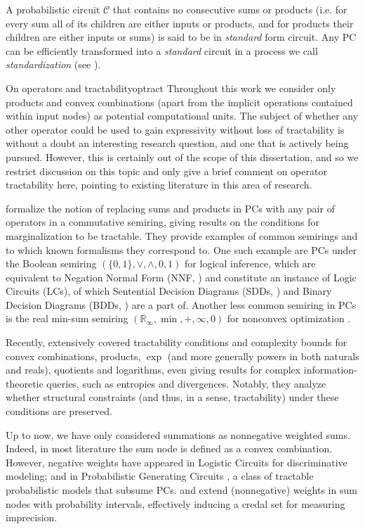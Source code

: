 A probabilistic circuit $\mathcal{C}$ that contains no consecutive sums or products (i.e. for every
sum all of its children are either inputs or products, and for products their children are either
inputs or sums) is said to be in \emph{standard} form circuit. Any PC can be efficiently
transformed into a \emph{standard} circuit in a process we call \emph{standardization} (see
).

\begin{remark}[breakable]{On operators and tractability}{optract}
  Throughout this work we consider only products and convex combinations (apart from the implicit
  operations contained within input nodes) as potential computational units. The subject of whether
  any other operator could be used to gain expressivity without loss of tractability is without a
  doubt an interesting research question, and one that is actively being pursued. However, this is
  certainly out of the scope of this dissertation, and so we restrict discussion on this topic and
  only give a brief comment on operator tractability here, pointing to existing literature in this
  area of research.

  \citet{friesen16} formalize the notion of replacing sums and products in PCs with any pair of
  operators in a commutative semiring, giving results on the conditions for marginalization to be
  tractable. They provide examples of common semirings and to which known formalisms they
  correspond to. One such example are PCs under the Boolean semiring $(\{0,1\},\vee,\wedge,0,1)$
  for logical inference, which are equivalent to Negation Normal Form (NNF, \cite{barwise82}) and
  constitute an instance of Logic Circuits (LCs), of which Sentential Decision Diagrams (SDDs,
  \cite{darwiche11}) and Binary Decision Diagrams (BDDs, \cite{akers78}) are a part of. Another
  less common semiring in PCs is the real min-sum semiring $(\mathbb{R}_{\infty}, \min,+,\infty,0)$
  for nonconvex optimization \citep{friesen15}.

  Recently, \citet{vergari21} extensively covered tractability conditions and complexity bounds for
  convex combinations, products, $\exp$ (and more generally powers in both naturals and reals),
  quotients and logarithms, even giving results for complex information-theoretic queries, such as
  entropies and divergences. Notably, they analyze whether structural constraints (and thus, in a
  sense, tractability) under these conditions are preserved.

  Up to now, we have only considered summations as nonnegative weighted sums. Indeed, in most
  literature the sum node is defined as a convex combination. However, negative weights have
  appeared in Logistic Circuits \citep{liang19} for discriminative modeling; and in Probabilistic
  Generating Circuits \citep{zhang21}, a class of tractable probabilistic models that subsume PCs.
  \citet{maua17a} and \citet{mattei20b} extend (nonnegative) weights in sum nodes with probability
  intervals, effectively inducing a credal set \citep{cozman00} for measuring imprecision.


\end{remark}
